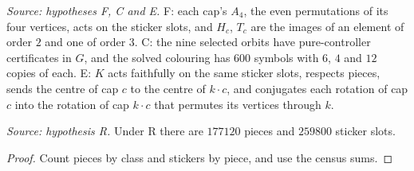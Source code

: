 \begin{definition}
  \label{def:hypotheses-fce}
  \leanok
  \textit{Source: hypotheses F, C and E.}
  F: each cap's \(A_4\), the even permutations of its four vertices, acts on
  the sticker slots, and \(H_c\), \(T_c\) are the images of an element of
  order \(2\) and one of order \(3\). C: the nine selected orbits have
  pure-controller certificates in \(G\), and the solved colouring has
  \(600\) symbols with \(6\), \(4\) and \(12\) copies of each. E: \(K\) acts
  faithfully on the same sticker slots, respects pieces, sends the centre
  of cap \(c\) to the centre of \(k\cdot c\), and conjugates each rotation
  of cap \(c\) into the rotation of cap \(k\cdot c\) that permutes its
  vertices through \(k\).
\end{definition}

\begin{lemma}
  \label{lem:model-totals}
  \leanok
  \textit{Source: hypothesis R.}
  Under R there are \(177120\) pieces and \(259800\) sticker slots.
\end{lemma}
\begin{proof}
  \leanok
  Count pieces by class and stickers by piece, and use the census sums.
\end{proof}

